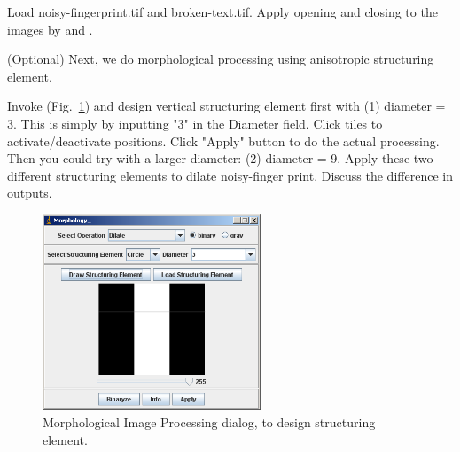 \begin{indentexercise}{1}
Load noisy-fingerprint.tif and broken-text.tif. Apply
opening and closing to the images by  and . 
\end{indentexercise}


\begin{indentexercise}{2}
(Optional) Next, we do morphological processing using anisotropic structuring
element. 

Invoke  (Fig.~\ref{fig:img68}) and design vertical structuring element first with (1)
diameter = 3. This is simply by inputting
"3" in the Diameter field. Click tiles
to activate/deactivate positions. Click
"Apply" button to do the actual
processing. Then you could try with a larger diameter: (2) diameter =
9. Apply these two different structuring elements to dilate
noisy-finger print. Discuss the difference in outputs. 


\begin{figure}[htbp]
\begin{center}
\includegraphics[width=6.5cm]{fig/CMCIBasicCourse201102-img68.png}
\caption{ Morphological Image Processing dialog, to design structuring element.}
\label{fig:img68}
\end{center}
\end{figure}
\end{indentexercise}

